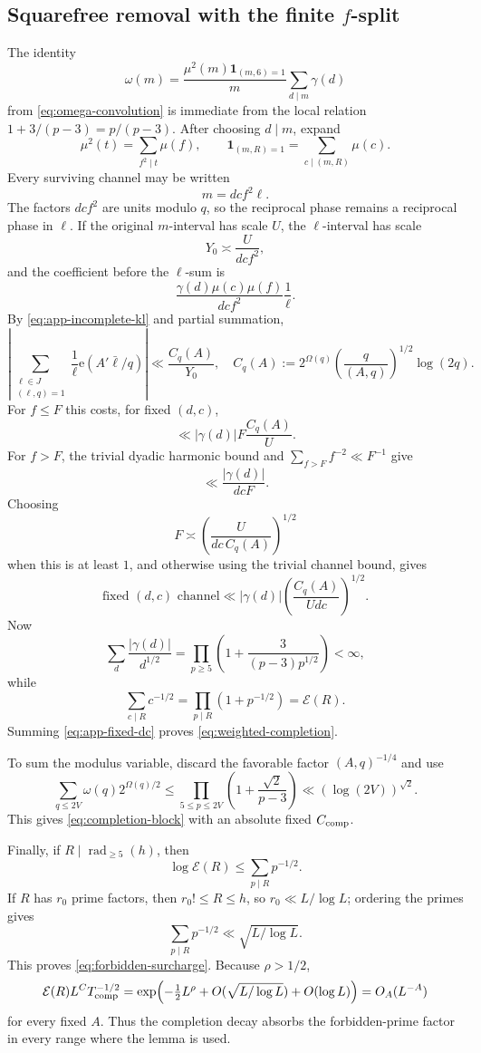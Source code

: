 \documentclass[11pt]{article}
\theoremstyle{definition}
\theoremstyle{remark}
\newcommand{\Ecal}{\mathcal E}
\newcommand{\rad}{\operatorname{rad}}
\newcommand{\e}{\mathrm e}
\newcommand{\1}{\mathbf 1}
\newcommand{\Om}{\Omega}
\newcommand{\om}{\omega}
\begin{document}
\subsection{Squarefree removal with the finite \texorpdfstring{$f$}{f}-split}
The identity
\[
\om(m)=\frac{\mu^2(m)\1_{(m,6)=1}}m\sum_{d\mid m}\gamma(d)
\]
from \cref{eq:omega-convolution} is immediate from the local relation
$1+3/(p-3)=p/(p-3)$.  After choosing $d\mid m$, expand
\[
\mu^2(t)=\sum_{f^2\mid t}\mu(f),
\qquad
\mathbf1_{(m,R)=1}=\sum_{c\mid(m,R)}\mu(c).
\]
Every surviving channel may be written
\[
m=dcf^2\ell.
\]
The factors $dcf^2$ are units modulo $q$, so the reciprocal phase remains a reciprocal phase in $\ell$.  If the original $m$-interval has scale $U$, the $\ell$-interval has scale
\[
Y_0\asymp\frac{U}{dcf^2},
\]
and the coefficient before the $\ell$-sum is
\[
\frac{\gamma(d)\mu(c)\mu(f)}{dcf^2}\frac1\ell.
\]
By \cref{eq:app-incomplete-kl} and partial summation,
\[
\left|\sum_{\substack{\ell\in J\\(\ell,q)=1}}
 \frac1\ell\e(A'\bar\ell/q)\right|
\ll \frac{C_q(A)}{Y_0},
\quad
C_q(A):=2^{\Om(q)}\left(\frac{q}{(A,q)}\right)^{1/2}\log(2q).
\]
For $f\le F$ this costs, for fixed $(d,c)$,
\[
\ll |\gamma(d)|F\frac{C_q(A)}U.
\]
For $f>F$, the trivial dyadic harmonic bound and
$\sum_{f>F}f^{-2}\ll F^{-1}$ give
\[
\ll\frac{|\gamma(d)|}{dcF}.
\]
Choosing
\[
F\asymp\left(\frac{U}{dc\,C_q(A)}\right)^{1/2}
\]
when this is at least $1$, and otherwise using the trivial channel bound, gives
\begin{equation}\label{eq:app-fixed-dc}
\text{fixed $(d,c)$ channel}
\ll|\gamma(d)|\left(\frac{C_q(A)}{Udc}\right)^{1/2}.
\end{equation}
Now
\[
\sum_d\frac{|\gamma(d)|}{d^{1/2}}
=\prod_{p\ge5}\left(1+\frac{3}{(p-3)p^{1/2}}\right)<\infty,
\]
while
\[
\sum_{c\mid R}c^{-1/2}=\prod_{p\mid R}(1+p^{-1/2})=\Ecal(R).
\]
Summing \cref{eq:app-fixed-dc} proves \cref{eq:weighted-completion}.

To sum the modulus variable, discard the favorable factor $(A,q)^{-1/4}$ and use
\[
\sum_{q\le2V}\om(q)2^{\Om(q)/2}
\le\prod_{5\le p\le2V}\left(1+\frac{\sqrt2}{p-3}\right)
\ll(\log(2V))^{\sqrt2}.
\]
This gives \cref{eq:completion-block} with an absolute fixed $C_{\rm comp}$.

Finally, if $R\mid\rad_{\ge5}(h)$, then
\[
\log\Ecal(R)\le\sum_{p\mid R}p^{-1/2}.
\]
If $R$ has $r_0$ prime factors, then $r_0!\le R\le h$, so
$r_0\ll L/\log L$; ordering the primes gives
\[
\sum_{p\mid R}p^{-1/2}\ll\sqrt{L/\log L}.
\]
This proves \cref{eq:forbidden-surcharge}.  Because $\rho>1/2$,
\[
\Ecal(R)L^CT_{\rm comp}^{-1/2}
=\exp\!\left(-\tfrac12L^\rho+O(\sqrt{L/\log L})+O(\log L)\right)
=O_A(L^{-A})
\]
for every fixed $A$.  Thus the completion decay absorbs the forbidden-prime factor in every range where the lemma is used.
\end{document}
